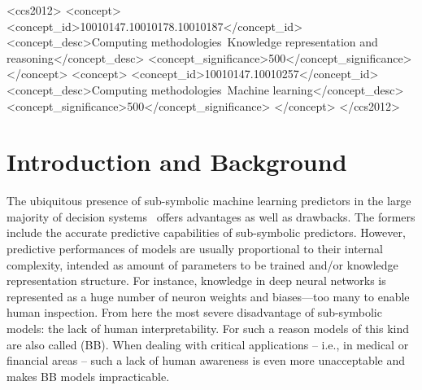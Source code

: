 \documentclass[sigconf]{acmart}
\begin{document}
\begin{CCSXML}
	<ccs2012>
	<concept>
	<concept_id>10010147.10010178.10010187</concept_id>
	<concept_desc>Computing methodologies~Knowledge representation and reasoning</concept_desc>
	<concept_significance>500</concept_significance>
	</concept>
	<concept>
	<concept_id>10010147.10010257</concept_id>
	<concept_desc>Computing methodologies~Machine learning</concept_desc>
	<concept_significance>500</concept_significance>
	</concept>
	</ccs2012>
\end{CCSXML}



\maketitle

\section{Introduction and Background}

The ubiquitous presence of sub-symbolic machine learning predictors in the large majority of decision systems~\cite{rocha2012far} offers advantages as well as drawbacks.
%
The formers include the accurate predictive capabilities of sub-symbolic predictors.
%
However, predictive performances of models are usually proportional to their internal complexity, intended as amount of parameters to be trained and/or knowledge representation structure.
%
For instance, knowledge in deep neural networks is represented as a huge number of neuron weights and biases---too many to enable human inspection.
%
From here the most severe disadvantage of sub-symbolic models: the lack of human interpretability.
%
For such a reason models of this kind are also called  (BB).
%
When dealing with critical applications -- i.e., in medical or financial areas -- such a lack of human awareness is even more unacceptable and makes BB models impracticable.
\end{document}
